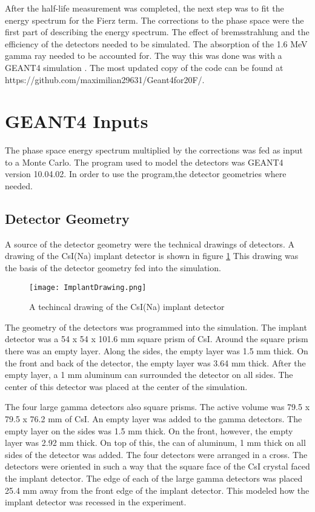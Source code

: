\documentclass[../MaxHughesThesis.tex]{subfiles}
\begin{document}
After the half-life measurement was completed, the next step was to fit the energy spectrum for the Fierz term. 
The corrections to the phase space were the first part of describing the energy spectrum.  
The effect of bremsstrahlung and the efficiency of the detectors needed to be simulated.
The absorption of the 1.6 MeV gamma ray needed to be accounted for. 
The way this was done was with a GEANT4 simulation \cite{Ago03}.
The most updated copy of the code can be found at https://github.com/maximilian29631/Geant4for20F/.


\section{GEANT4 Inputs}
The phase space energy spectrum multiplied by the corrections was fed as input to a Monte Carlo.
The program used to model the detectors was GEANT4 version 10.04.02.
In order to use the program,the detector geometries where needed.

\subsection{Detector Geometry}
A source of the detector geometry were the technical drawings of detectors. 
A drawing of the CsI(Na) implant detector is shown in figure \ref{fig:ImplantTech}
This drawing was the basis of the detector geometry fed into the simulation.

\begin{figure}[!htb]
	\centerline{\texttt{[image: ImplantDrawing.png]}}
	\caption{A techincal drawing of the CsI(Na) implant detector}
	\label{fig:ImplantTech}
\end{figure}

The geometry of the detectors was programmed into the simulation.
The implant detector was a 54 x 54 x 101.6 mm square prism of CsI.
Around the square prism there was an empty layer.
Along the sides, the empty layer was 1.5 mm thick.
On the front and back of the detector, the empty layer was 3.64 mm thick.
After the empty layer, a 1 mm aluminum can surrounded the detector on all sides.  
The center of this detector was placed at the center of the simulation.

The four large gamma detectors also square prisms.
The active volume was 79.5 x 79.5 x 76.2 mm of CsI.
An empty layer was  added to the gamma detectors.
The empty layer on the sides was 1.5 mm thick.
On the front, however, the empty layer was 2.92 mm thick.
On top of this, the can of aluminum, 1 mm thick on all sides of the detector was added.
The four detectors were arranged in a cross.
The detectors were oriented in such a way that the square face of the CsI crystal faced the implant detector. 
The edge of each of the large gamma detectors was placed 25.4 mm away from the front edge of the implant detector.
This modeled how the implant detector was recessed in the experiment.
\end{document}
